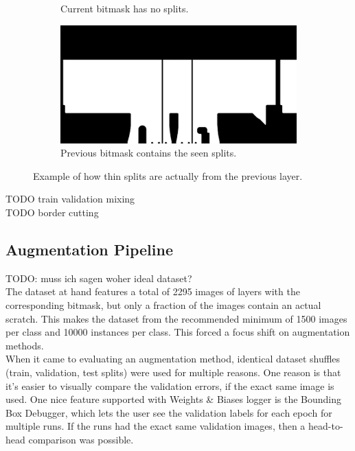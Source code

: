 \begin{figure}[!h]
\begin{center}
\begin{subfigure}{0.6\textwidth}
        \caption{Current bitmask has no splits.}
    \end{subfigure}
    \begin{subfigure}{0.6\textwidth}
        \includegraphics[width=\textwidth]{images/thin_scratch_previous_layer/bitmask_00106}
        \caption{Previous bitmask contains the seen splits.}
    \end{subfigure}
            \quad

\caption{Example of how thin splits are actually from the previous layer.}
\label{fig:thin_splits_previous_layer}
\end{center}
\end{figure}

TODO train validation mixing \\
TODO border cutting \\


\subsection{Augmentation Pipeline}
TODO: muss ich sagen woher ideal dataset? \\
The dataset at hand features a total of 2295 images of layers with the corresponding bitmask, but only a fraction of the images contain an actual scratch. This makes the dataset from the recommended minimum of 1500 images per class and 10000 instances per class. This forced a focus shift on augmentation methods. \\
When it came to evaluating an augmentation method, identical dataset shuffles (train, validation, test splits) were used for multiple reasons. One reason is that it's easier to visually compare the validation errors, if the exact same image is used. One nice feature supported with Weights \& Biases logger is the Bounding Box Debugger, which lets the user see the validation labels for each epoch for multiple runs. If the runs had the exact same validation images, then a head-to-head comparison was possible.\\

